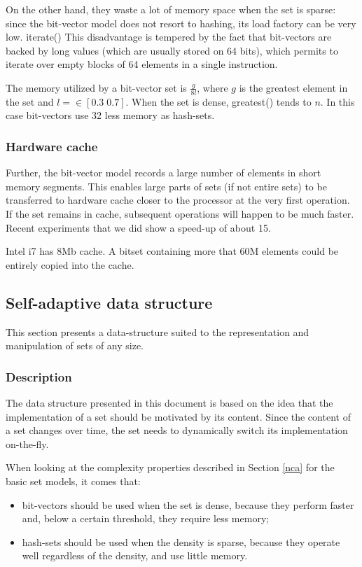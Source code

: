 \documentclass{article}
\begin{document}
On the other hand, they waste a lot of memory space when the set is sparse: since the bit-vector model does
not resort to hashing, its load factory can be very low. iterate()
This disadvantage is tempered by the fact that bit-vectors are backed by long values (which are usually stored on 64 bits), which
permits to iterate over empty blocks of 64 elements in a single instruction.


The memory utilized by a bit-vector set is $\frac{g}{8l}$, where $g$ is the greatest element in the set and $l = \in [0.3\;0.7]$.
When the set is dense, greatest() tends to $n$. In this case bit-vectors use 32 less memory as hash-sets.


\subsubsection{Hardware cache}

Further, the bit-vector model records a large number of elements in short memory segments. This enables large parts of sets (if not entire sets)
to be  transferred to hardware cache closer to the processor at the very first operation. If the set remains in cache, subsequent
operations will happen to be much faster. Recent experiments that we did show a speed-up of about 15. 

Intel i7 has 8Mb cache. A bitset containing more that 60M elements could be entirely copied into the cache.


\subsection{Self-adaptive data structure}

This section presents a data-structure suited to the representation and manipulation of sets of any size.

\subsubsection{Description}

The data structure presented in this document is based on the idea that the implementation of a set
 should be motivated by its content. Since the content of a set changes over time, the set needs to dynamically switch its implementation on-the-fly.

When looking at the complexity properties described  in Section \ref{nca} for the basic set models, it comes that:
\begin{itemize}
  \item bit-vectors should be used when the set is dense, because they perform faster and, below a certain threshold,
  they require less memory;
  \item hash-sets should be used when the density is sparse, because they operate well regardless of the density, and use little
  memory.
\end{itemize}
\end{document}
